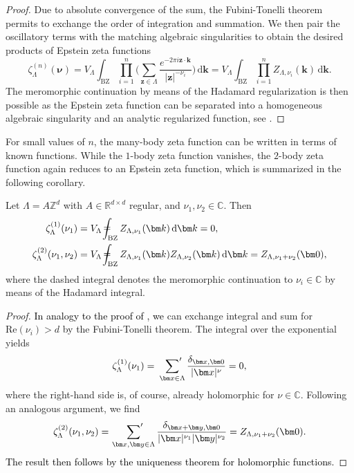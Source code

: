\documentclass[]{amsart}
\numberwithin{mythm}{section}
\def\Xint#1{\mathchoice
   {\XXint\displaystyle\textstyle{#1}}%
   {\XXint\textstyle\scriptstyle{#1}}%
   {\XXint\scriptstyle\scriptscriptstyle{#1}}%
   {\XXint\scriptscriptstyle\scriptscriptstyle{#1}}%
   \!\int}
\def\XXint#1#2#3{{\setbox0=\hbox{$#1{#2#3}{\int}$}
     \vcenter{\hbox{$#2#3$}}\kern-.5\wd0}}
\def\ddashint{\Xint=}
\newcommand{\new}[1]{{\textcolor{black}{#1}}}
\begin{document}
\begin{proof}
    Due to absolute convergence of the sum, the Fubini-Tonelli theorem permits to exchange the order of integration and summation. We then pair the oscillatory terms with the matching algebraic singularities to obtain the desired products of Epstein zeta functions
    \[
    \zeta_\Lambda^{(n)}(\bm \nu) = V_\Lambda \int_{\mathrm{BZ}} \prod_{i=1}^n \bigg(\sum_{\bm z\in \Lambda} \frac{e^{-2\pi i \bm z\cdot \bm k}}{\vert \bm z\vert^{-\nu_i}}\bigg)\,\mathrm d \bm k = V_\Lambda \int_{\mathrm{BZ}} \prod_{i=1}^n Z_{\Lambda,\nu_i}(\bm k)\,\mathrm d \bm k.
    \]
    The meromorphic continuation by means of the Hadamard regularization \cite{gelfand1964generalizedI} is then possible as the Epstein zeta function can be separated into a homogeneous algebraic singularity and an analytic regularized function, see \cite{buchheit2024computation}.
\end{proof}

For small values of $n$, the many-body zeta function can be written in terms of known functions. 
While the $1$-body zeta function vanishes, the $2$-body zeta function again reduces to an Epstein zeta function, which is summarized in the following corollary.

\begin{corollary}
\label{OneTwoBodyZetaFunction}
    Let $\Lambda=A\mathds Z^d$ with $A\in \mathds R^{d\times d}$ regular, and $\nu_1,\nu_2\in \mathds C$. Then
    \begin{align*}
    \zeta_{\Lambda}^{(1)}(\nu_1) &= V_\Lambda \,\ddashint_{\mathrm{BZ}} Z_{\Lambda,\nu_1}(\bm k)\,\mathrm d \bm k = 0,\\
    \zeta_{\Lambda}^{(2)}(\nu_1,\nu_2) & = V_\Lambda \,\ddashint_{\mathrm{BZ}} Z_{\Lambda,\nu_1}(\bm k)Z_{\Lambda,\nu_2}(\bm k)\,\mathrm d \bm k = Z_{\Lambda,\nu_1+\nu_2}(\bm 0),
    \end{align*}
    where the dashed integral denotes the meromorphic continuation to $\nu_i\in \mathds C$ by means of the Hadamard integral.
    \begin{proof}
        \new{In analogy to the proof of \Cref{thm:epstein_representation}, we} can exchange integral and sum for $\mathrm{Re}(\nu_i)>d$ by the Fubini-Tonelli theorem. The integral over the exponential yields
        \[
        \zeta_{\Lambda}^{(1)}(\nu_1) = ~\sideset{}{'} \sum_{\bm x\in \Lambda} \frac{\delta_{\bm x,\bm 0}}{\vert \bm x\vert^\nu} = 0,
        \]
        where the right-hand side is, of course, already holomorphic for $\nu\in \mathds C$. Following an analogous argument, we find 
        \begin{align*}
          \zeta_{\Lambda}^{(2)}(\nu_1,\nu_2) =\,\sideset{}{'} \sum_{\bm x,\bm y\in \Lambda} \frac{\delta_{\bm x+\bm y,\bm 0}}{\vert \bm x\vert^{\nu_1}\vert \bm y\vert^{\nu_2}} = Z_{\Lambda,\nu_1+\nu_2}(\bm 0).
        \end{align*}
        \new{The result then follows by the uniqueness theorem for holomorphic functions.}
    \end{proof}
\end{corollary}
\end{document}
